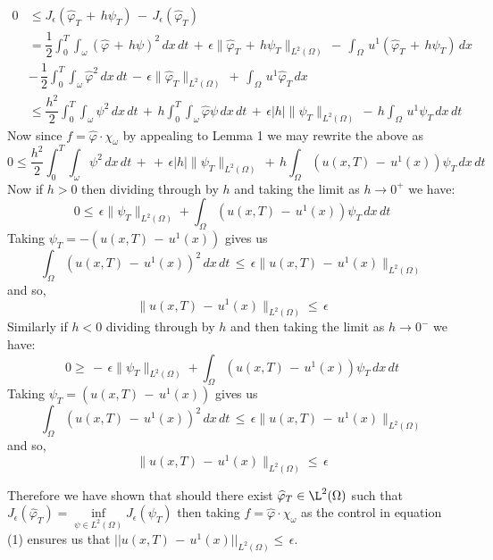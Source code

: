 \documentclass[11pt]{article}
\begin{document}
\begin{equation*}
\begin{aligned}
0 &\leq J_\epsilon(\widehat{\varphi}_T\,+\,h\psi_T)\,-\,J_\epsilon(\widehat{\varphi}_T)\\
&= \dfrac{1}{2}\int_{0}^{T}\int_\omega\left(\widehat{\varphi}\,+\,h\psi\right)^2\,dx\,dt\, +\,\epsilon\lVert\widehat{\varphi}_T\,+\,h\psi_T\rVert_{L^2(\Omega)}\, -\,\int_\Omega\,u^1\left(\widehat{\varphi}_T\,+\,h\psi_T\right)\,dx\\
 &-\, \dfrac{1}{2}\int_{0}^{T}\int_\omega\widehat{\varphi}^2\,dx\,dt\, -\,\epsilon\lVert \widehat{\varphi}_T \rVert_{L^2(\Omega)}\, +\,\int_\Omega\,u^1\widehat{\varphi}_T\,dx\\
 &\leq \dfrac{h^2}{2}\int_{0}^{T}\int_\omega\psi^2\,dx\,dt\,+\,h\int_{0}^{T}\int_\omega\widehat{\varphi}\psi\,dx\,dt \,+\,\epsilon|h|\lVert\psi_T\rVert_{L^2(\Omega)} \,-\, h\int_\Omega\,u^1\psi_T\,dx\,dt
\end{aligned}
\end{equation*}
Now since $f=\widehat{\varphi}\cdot\chi_\omega$ by appealing to Lemma 1 we may rewrite the above as 
$$0 \leq\dfrac{h^2}{2}\int_{0}^{T}\int_\omega\psi^2\,dx\,dt\,+\,+\,\epsilon|h|\lVert\psi_T\rVert_{L^2(\Omega)} \,+\, h\int_\Omega(u(x,T)\,-\,u^1(x))\psi_T\,dx\,dt$$
Now if $h>0$ then dividing through by $h$ and taking the limit as $h\rightarrow 0^+$ we have:
$$0\leq\,\epsilon\lVert\psi_T\rVert_{L^2(\Omega)} +\int_\Omega(u(x,T)\,-\,u^1(x))\psi_T\,dx\,dt$$
Taking $\psi_T = - (u(x,T)\,-\,u^1(x))$ gives us
$$\int_\Omega (u(x,T)\,-\,u^1(x))^2\,dx\,dt\,\leq\,\epsilon\lVert u(x,T)\,-\,u^1(x)\rVert_{L^2(\Omega)}$$
and so,
$$\lVert u(x,T)\,-\,u^1(x)\rVert_{L^2(\Omega)}\leq\,\epsilon$$
Similarly if $h<0$ dividing through by $h$ and then taking the limit as $h\rightarrow 0^-$ we have:
$$0\geq\,-\,\epsilon\lVert\psi_T\rVert_{L^2(\Omega)} +\int_\Omega(u(x,T)\,-\,u^1(x))\psi_T\,dx\,dt$$
Taking $\psi_T = (u(x,T)\,-\,u^1(x))$ gives us
$$\int_\Omega (u(x,T)\,-\,u^1(x))^2\,dx\,dt\,\leq\,\epsilon\lVert u(x,T)\,-\,u^1(x)\rVert_{L^2(\Omega)}$$
and so,
$$\lVert u(x,T)\,-\,u^1(x)\rVert_{L^2(\Omega)}\leq\,\epsilon$$

Therefore we have shown that should there exist $\widehat{\varphi}_T \in\L^2(\Omega)$ such that $J_\epsilon (\widehat{\varphi}_T) = \inf\limits_{\psi \in L^2(\Omega)} J_\epsilon (\psi_T)$ then taking $f=\widehat{\varphi}\cdot\chi_\omega$ as the control in equation (1) ensures us that $||u(x,T)\,-\,u^1(x)||_{L^2(\Omega)}\leq\,\epsilon$.\\
\end{document}
